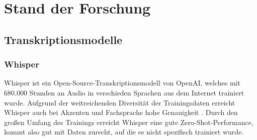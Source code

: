 \chapter{Stand der Forschung}\label{ch:relatedWork}




\section{Transkriptionsmodelle}

\subsection{Whisper}
Whisper ist ein Open-Source-Transkriptionsmodell von OpenAI, welches mit 680.000 Stunden an Audio in verschieden Sprachen aus dem Internet trainiert wurde.
Aufgrund der weitreichenden Diversität der Trainingsdaten erreicht Whisper auch bei Akzenten und Fachsprache  hohe Genauigkeit \citep{whisper}.
Durch den großen Umfang des Trainings erreicht Whisper eine gute Zero-Shot-Performance, kommt also gut mit Daten zurecht, auf die es nicht spezifisch trainiert wurde.

